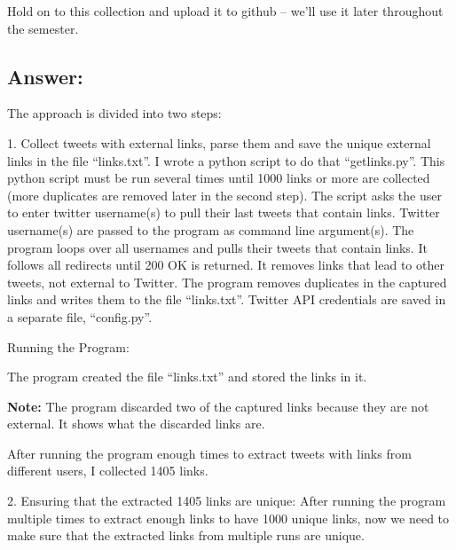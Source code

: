 \documentclass[a4paper, 11pt]{article}
\begin{document}
Hold on to this collection and upload it to github -- we'll use it
later throughout the semester.

\subsection*{Answer:}
The approach is divided into two steps:

1. Collect tweets with external links, parse them and save the unique external links in the file ``links.txt''. I wrote a python script to do that ``getlinks.py''. This python script must be run several times until 1000 links or more are collected (more duplicates are removed later in the second step).
The script asks the user to enter twitter username(s) to pull their last tweets that contain links. Twitter username(s) are passed to the program as command line argument(s). The program loops over all usernames and pulls their tweets that contain links. It follows all redirects until 200 OK is returned. It removes links that lead to other tweets, not external to Twitter. The program removes duplicates in the captured links and writes them to the file ``links.txt''.
Twitter API credentials are saved in a separate file, ``config.py''.




Running the Program: 

The program created the file ``links.txt'' and stored the links in it. 

\textbf{Note:} The program discarded two of the captured links because they are not external. It shows what the discarded links are. 

After running the program enough times to extract tweets with links from different users, I collected 1405 links.



2. Ensuring that the extracted 1405 links are unique:
After running the program multiple times to extract enough links to have 1000 unique links, now we need to make sure that the extracted links from multiple runs are unique.
\end{document}
